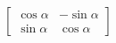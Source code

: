 \documentclass[12pt]{article}
\begin{document}
    \[ \left[ \begin{array}{rr}
        \cos{\alpha} & -\sin{\alpha} \\
        \sin{\alpha} & \cos{\alpha}
    \end{array} \right] \]
\end{document}
